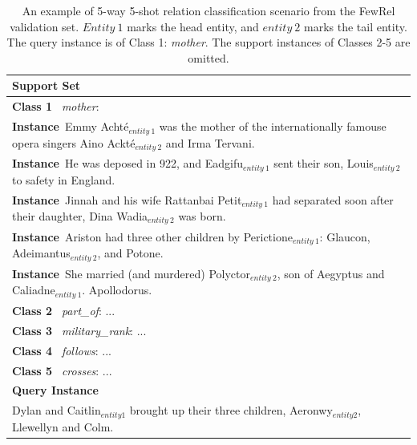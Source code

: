 \begin{table}[t]
	\centering
	\small
	\caption{\label{FewShotRCExample}
		An example of 5-way 5-shot relation classification scenario from the FewRel validation set. $Entity~1$ marks the head entity, and $entity~2$ marks the tail entity. The query instance is of Class 1: \emph{mother}. The support instances of Classes 2-5 are omitted.
	}
	\begin{tabular}{p{8cm}}
		\hline
		\textbf{Support Set} \\ \hline
		\textbf{Class 1} \emph{~mother}: \\
		\qquad \textbf{Instance\;1}~\lbrack Emmy Acht\'e\rbrack$_{entity~1}$ was the mother of the internationally famouse opera singers \lbrack Aino Ackt\'e\rbrack$_{entity~2}$ and Irma Tervani. \\
		\qquad \textbf{Instance\;2}~He was deposed in 922, and \lbrack Eadgifu\rbrack$_{entity~1}$ sent their son, \lbrack Louis\rbrack$_{entity~2}$ to safety in England. \\
		\qquad \textbf{Instance\;3}~Jinnah and his wife \lbrack Rattanbai Petit\rbrack$_{entity~1}$ had separated soon after their daughter, \lbrack Dina Wadia\rbrack$_{entity~2}$ was born. \\
		\qquad \textbf{Instance\;4}~Ariston had three other children by \lbrack Perictione\rbrack$_{entity~1}$: Glaucon, \lbrack Adeimantus\rbrack$_{entity~2}$, and Potone.\\
		\qquad \textbf{Instance\;5}~She married (and murdered) \lbrack Polyctor\rbrack$_{entity~2}$, son of Aegyptus and \lbrack Caliadne\rbrack$_{entity~1}$. Apollodorus.\\
		\textbf{Class 2} \emph{~part\_of}: ... \\
		\textbf{Class 3} \emph{~military\_rank}: ... \\
		\textbf{Class 4} \emph{~follows}: ... \\
		\textbf{Class 5} \emph{~crosses}: ... \\ \hline
		\textbf{Query Instance} \\ \hline
		Dylan and \lbrack Caitlin\rbrack$_{entity1}$ brought up their three children, \lbrack Aeronwy\rbrack$_{entity2}$, Llewellyn and Colm. \\
		\hline
	\end{tabular}
\end{table}

